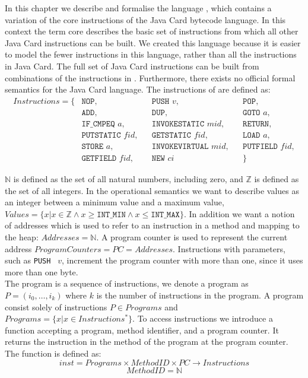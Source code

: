 In this chapter we describe and formalise the language \jcl, which contains a variation of the core instructions of the Java Card bytecode language. In this context the term core describes the basic set of instructions from which all other Java Card instructions can be built. 
We created this language because it is easier to model the fewer instructions in this language, rather than all the instructions in Java Card.
The full set of Java Card instructions can be built from combinations of the instructions in \jcl.
Furthermore, there exists no official formal semantics for the Java Card language.
The instructions of \jcl are defined as:
\begin{align*}
  Instructions = \{
  & \texttt{NOP}, && \texttt{PUSH } v, && \texttt{POP}, \\ 
  & \texttt{ADD}, && \texttt{DUP}, && \texttt{GOTO } a, \\ 
  & \texttt{IF\_CMPEQ } a, && \texttt{INVOKESTATIC } mid, && \texttt{RETURN},\\ 
  & \texttt{PUTSTATIC } fid, && \texttt{GETSTATIC } fid, && \texttt{LOAD } a, \\
  & \texttt{STORE } a, && \texttt{INVOKEVIRTUAL } mid, && \texttt{PUTFIELD } fid,\\ 
  & \texttt{GETFIELD } fid, && \texttt{NEW } ci && \}
\end{align*}

$\mathbb{N}$ is defined as the set of all natural numbers, including zero, and $\mathbb{Z}$ is defined as the set of all integers.
In the operational semantics we want to describe values as an integer between a minimum value and a maximum value, $Values = \{ x | x \in \mathbb{Z} \wedge x \geq \texttt{INT\_MIN} \wedge x \leq \texttt{INT\_MAX} \}$.
In addition we want a notion of addresses which is used to refer to an instruction in a method and mapping to the heap: $Addresses  = \mathbb{N}$.
A program counter is used to represent the current address $ProgramCounters = PC = Addresses$. Instructions with parameters, such as \texttt{PUSH } $v$, increment the program counter with more than one, since it uses more than one byte. \\

The program is a sequence of instructions, we denote a program as $P = (i_0, \ldots, i_k)$ where $k$ is the number of instructions in the program. 
A program consist solely of instructions $P \in Programs$ and $Programs =  \{ x | x \in Instructions^{*} \}$.
To access instructions we introduce a function accepting a program, method identifier, and a program counter. 
It returns the instruction in the method of the program at the program counter.
The function is defined as:
$$inst = Programs \times MethodID \times PC \to   Instructions$$
$$MethodID = \mathbb{N}$$

